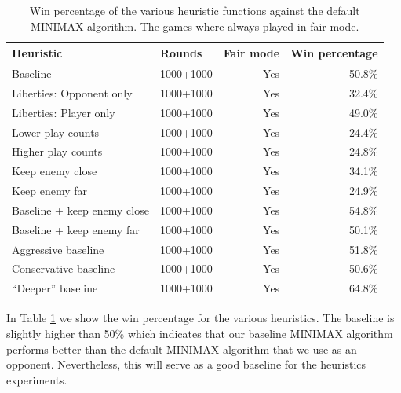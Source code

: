 \documentclass[aps,prd,notitlepage,floatfix,superscriptaddress,groupedaddress,nofootinbib]{revtex4-1}
\begin{document}
\begin{table}[H]
    \centering
    \caption{Win percentage of the various heuristic functions against the default MINIMAX algorithm. The games where always played in fair mode.}
    \label{tab:win_percentage_heuristics}
    \begin{ruledtabular}
        \begin{tabular}{l|l|r|r}
            Heuristic                   & Rounds  & Fair mode     & Win percentage  \\
            \toprule
            Baseline                    & 1000+1000 & Yes           & 50.8\%      \\
            Liberties: Opponent only    & 1000+1000 & Yes           & 32.4\%      \\
            Liberties: Player only      & 1000+1000 & Yes           & 49.0\%      \\
            Lower play counts           & 1000+1000 & Yes           & 24.4\%      \\
            Higher play counts          & 1000+1000 & Yes           & 24.8\%      \\
            Keep enemy close            & 1000+1000 & Yes           & 34.1\%      \\
            Keep enemy far              & 1000+1000 & Yes           & 24.9\%      \\
            Baseline + keep enemy close & 1000+1000 & Yes           & 54.8\%      \\
            Baseline + keep enemy far   & 1000+1000 & Yes           & 50.1\%      \\
            Aggressive baseline         & 1000+1000 & Yes           & 51.8\%      \\
            Conservative baseline       & 1000+1000 & Yes           & 50.6\%      \\
            ``Deeper'' baseline         & 1000+1000 & Yes           & 64.8\%      \\
        \end{tabular}
    \end{ruledtabular}
\end{table}

In Table \ref{tab:win_percentage_heuristics} we show the win percentage for the various heuristics. The baseline is slightly higher than 50\% which indicates that our baseline MINIMAX algorithm performs better than the default MINIMAX algorithm that we use as an opponent. Nevertheless, this will serve as a good baseline for the heuristics experiments.
\end{document}
